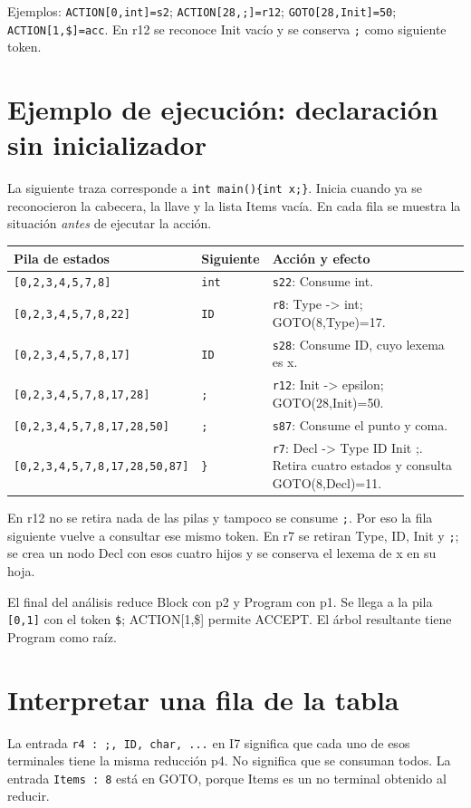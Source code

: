 Ejemplos: \texttt{ACTION[0,int]=s2}; \texttt{ACTION[28,;]=r12}; \texttt{GOTO[28,Init]=50}; \texttt{ACTION[1,\$]=acc}. En r12 se reconoce Init vacío y se conserva \texttt{;} como siguiente token.
\clearpage
\section*{Ejemplo de ejecución: declaración sin inicializador}
La siguiente traza corresponde a \texttt{int main()\{int x;\}}. Inicia cuando ya se reconocieron la cabecera, la llave y la lista Items vacía. En cada fila se muestra la situación \emph{antes} de ejecutar la acción.

{\small\begin{longtable}{@{}p{8.6cm}p{1.7cm}p{4.8cm}@{}}\toprule Pila de estados & Siguiente & Acción y efecto\\\midrule\endhead
\texttt{[0,2,3,4,5,7,8]} & \texttt{int} & \texttt{s22}: Consume int.\\
\texttt{[0,2,3,4,5,7,8,22]} & \texttt{ID} & \texttt{r8}: Type -> int; GOTO(8,Type)=17.\\
\texttt{[0,2,3,4,5,7,8,17]} & \texttt{ID} & \texttt{s28}: Consume ID, cuyo lexema es x.\\
\texttt{[0,2,3,4,5,7,8,17,28]} & \texttt{;} & \texttt{r12}: Init -> epsilon; GOTO(28,Init)=50.\\
\texttt{[0,2,3,4,5,7,8,17,28,50]} & \texttt{;} & \texttt{s87}: Consume el punto y coma.\\
\texttt{[0,2,3,4,5,7,8,17,28,50,87]} & \texttt{\}} & \texttt{r7}: Decl -> Type ID Init ;. Retira cuatro estados y consulta GOTO(8,Decl)=11.\\
\bottomrule\end{longtable}}
En r12 no se retira nada de las pilas y tampoco se consume \texttt{;}. Por eso la fila siguiente vuelve a consultar ese mismo token. En r7 se retiran Type, ID, Init y \texttt{;}; se crea un nodo Decl con esos cuatro hijos y se conserva el lexema de x en su hoja.

El final del análisis reduce Block con p2 y Program con p1. Se llega a la pila \texttt{[0,1]} con el token \texttt{\$}; ACTION[1,\$] permite ACCEPT. El árbol resultante tiene Program como raíz.
\section*{Interpretar una fila de la tabla}
La entrada \texttt{r4 : ;, ID, char, ...} en I7 significa que cada uno de esos terminales tiene la misma reducción p4. No significa que se consuman todos. La entrada \texttt{Items : 8} está en GOTO, porque Items es un no terminal obtenido al reducir.

